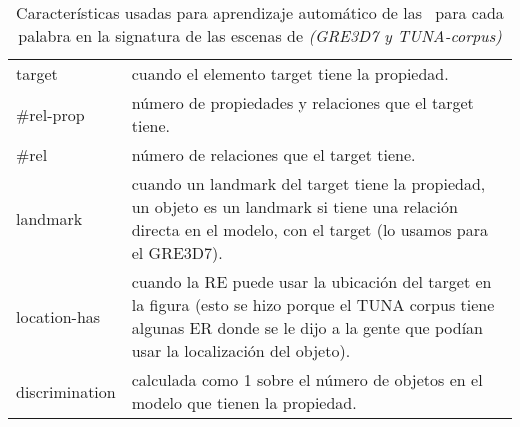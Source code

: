 \begin{small}
\begin{table}[h]
\begin{center}
\begin{tabular}{|l|p{10cm}|}
\hline
target & cuando el elemento target tiene la propiedad. \\
\#rel-prop & n\'umero de propiedades y relaciones que el target tiene.\\
\#rel & n\'umero de relaciones que el target tiene. \\
landmark & cuando un landmark del target tiene la propiedad, un objeto es un landmark si tiene una relaci\'on directa en el modelo, con el target (lo usamos para el GRE3D7).\\
location-has & cuando la RE puede usar la ubicaci\'on del target en la figura (esto se hizo porque el TUNA corpus tiene algunas ER donde se le dijo a la gente que pod\'ian usar la localizaci\'on del objeto).\\
discrimination & calculada como 1 sobre el n\'umero de objetos en el modelo que tienen la propiedad.  \\
\hline
\end{tabular}
\caption{Caracter\'isticas usadas para aprendizaje autom\'atico de las \puse~para cada palabra en la signatura de las escenas de \textit{(GRE3D7 y TUNA-corpus)} \label{features}}
\end{center}
\end{table}
\end{small}



